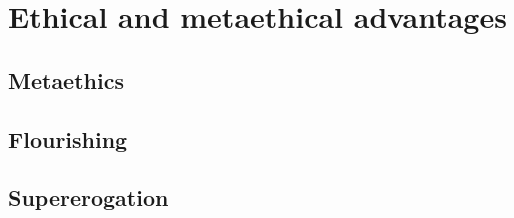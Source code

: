 \def\mychapter{III}
\chapter{Ethical and metaethical advantages}\label{ch:meta}
\section{Metaethics}
\section{Flourishing}
\section{Supererogation}
\chaptertail